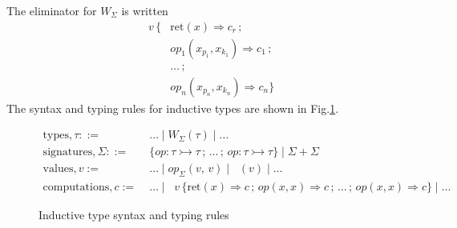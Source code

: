 \documentclass[acmsmall, screen, review, anonymous]{acmart}
\theoremstyle{definition}
\newcommand{\glob}{\mathop{\Box}}
\newcommand{\ind}[1]{W_{#1}}
\newcommand{\indintro}[4]{#2_{#1}(#3,\, #4)}
\newcommand{\retname}{\mathrm{ret}}
\newcommand{\ret}[2]{\mathop{\retname_{#1}}(#2)}
\newcommand{\indelim}[3]{\mathop{\mathrm{rec}_{#1}} #2 \,\{#3\}}
\newcommand{\indretcase}[2]{\retname(#1) \Rightarrow #2}
\newcommand{\indcase}[4]{#1(#2, #3) \Rightarrow #4}
\newcommand{\seq}{\,;\,}
\newcommand{\types}{\mathrel{:}}
\newcommand{\ccons}[2]{#1;\,#2}
\newcommand{\lbind}[3]{\ccons{#1}{#2\types#3}}
\newcommand{\turnv}{\mathrel{\vdash_V}}
\newcommand{\turnc}{\mathrel{\vdash_C}}
\begin{document}
The eliminator for $\ind{\Sigma}$ is written
\begin{align*}
\indelim{\Sigma}{v}
  {&\indretcase{x}{c_r} \seq \\
   &\indcase{op_1}{x_{p_1}}{x_{k_1}}{c_1} \seq \\
   &\ldots \seq \\
   &\indcase{op_n}{x_{p_n}}{x_{k_n}}{c_n}}
\end{align*}
The syntax and typing rules for inductive types are shown in
Fig.\ref{fig:typing-inductive}.

\begin{figure}
\begin{align*}
  \mathrm{types}, \tau ::=\;& \ldots \mid \ind{\Sigma}(\tau) \mid \ldots \\
  \mathrm{signatures}, \Sigma ::=\;& \{ op \types \tau \rightarrowtail \tau \seq \ldots
                                       \seq op \types \tau \rightarrowtail \tau \}
                                     \mid \Sigma + \Sigma \\
  \mathrm{values}, v :=\;& \ldots \mid \indintro{\Sigma}{op}{v}{v}
                           \mid \ret{\Sigma}{v} \mid \ldots \\
  \mathrm{computations}, c :=\;& \ldots \mid \indelim{\Sigma}{v}
                                 {\indretcase{x}{c} \seq
                                 \indcase{op}{x}{x}{c} \seq \ldots
                                 \seq \indcase{op}{x}{x}{c}} \mid \ldots
\end{align*}
\caption{Inductive type syntax and typing rules}
\label{fig:typing-inductive}
\end{figure}
\end{document}
